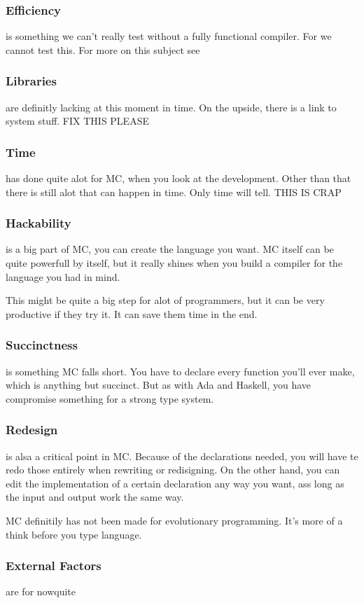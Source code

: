 \begin{multicols}{2}
\subsubsection{Efficiency}
is something we can't really test without a fully functional compiler.
For we cannot test this.
For more on this subject see \cite{jarnoshizzle}

\subsubsection{Libraries} are definitly lacking at this moment in time.
On the upside, there is a link to system stuff.
FIX THIS PLEASE

\subsubsection{Time} has done quite alot for MC, when you look at the development.
Other than that there is still alot that can happen in time.
Only time will tell.
THIS IS CRAP

\subsubsection{Hackability} is a big part of MC, you can create the language you want.
MC itself can be quite powerfull by itself, but it really shines when you build a compiler for the language you had in mind.

This might be quite a big step for alot of programmers, but it can be very productive if they try it.
It can save them time in the end.

\subsubsection{Succinctness} is something MC falls short.
You have to declare every function you'll ever make, which is anything but succinct.
But as with Ada and Haskell, you have compromise something for a strong type system.

\subsubsection{Redesign} is alsa a critical point in MC.
Because of the declarations needed, you will have te redo those entirely when rewriting or redisigning.
On the other hand, you can edit the implementation of a certain declaration any way you want, ass long as the input and output work the same way.

MC definitily has not been made for evolutionary programming.
It's more of a think before you type language.

\subsubsection{External Factors} are for nowquite

\end{multicols}


